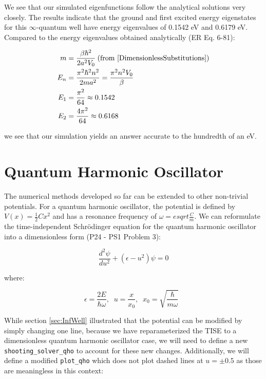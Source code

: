 \documentclass{article}
\begin{document}
We see that our simulated eigenfunctions follow the analytical solutions very
closely. The results indicate that the ground and first excited energy
eigenstates for this $\infty$-quantum well have energy eigenvalues of 0.1542 eV
and 0.6179 eV.  Compared to the energy eigenvalues obtained analytically (ER Eq.
6-81):

\begin{align}
    m &= \frac{\beta\hbar^2}{2a^2V_0} \:(\text{from } \eqref{DimensionlessSubstitutions})\nonumber \\
    E_n &= \frac{\pi^2 \hbar^2 n^2}{2ma^2} = \frac{\pi^2n^2V_0}{\beta} \nonumber \\
    E_1 &= \frac{\pi^2}{64} \approx 0.1542 \\
    E_2 &= \frac{4\pi^2}{64} \approx 0.6168 
\end{align}

we see that our simulation yields an answer accurate to the hundredth of an eV.

\section{Quantum Harmonic Oscillator}
The numerical methods developed so far can be extended to other non-trivial potentials. For a 
quantum harmonic oscillator, the potential is defined by $V(x) =
\frac{1}{2}Cx^2$ and has a resonance frequency of $\omega =
esqrt{\frac{C}{m}}$.  We can reformulate the time-independent Schr\"{o}dinger
equation for the quantum harmonic oscillator into a dimensionless form (P24 -
PS1 Problem 3):

\begin{equation}
    \frac{d^2\psi}{du^2} + (\epsilon - u^2)\psi = 0
\end{equation}

where:

\begin{equation}
    \epsilon = \frac{2E}{\hbar\omega},\;\;
    u = \frac{x}{x_0},\;\;
    x_0 = \sqrt{\frac{\hbar}{m\omega}}\;\;
\end{equation}

While section \ref{sec:InfWell} illustrated that the potential can be modified by simply changing
one line, because we have reparameterized the TISE to a dimensionless quantum harmonic oscillator
case, we will need to define a new \texttt{shooting\_solver\_qho} to account for these new changes. 
Additionally, we will define a modified \texttt{plot\_qho} which does not plot
dashed lines at $u=\pm0.5$ as those are meaningless in this context:
\end{document}
